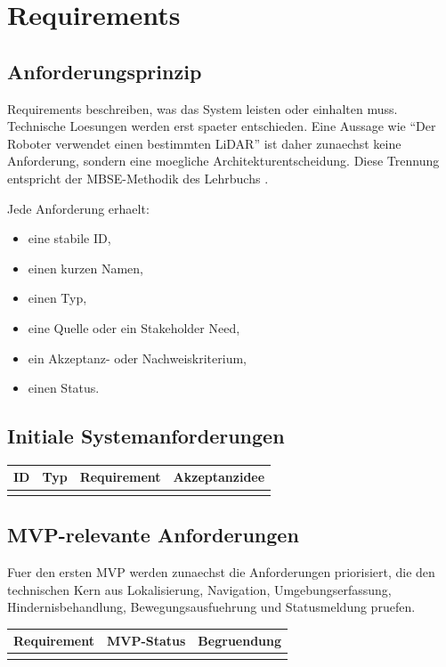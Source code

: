 \chapter{Requirements}

\section{Anforderungsprinzip}

Requirements beschreiben, was das System leisten oder einhalten muss. Technische Loesungen werden erst spaeter entschieden. Eine Aussage wie \enquote{Der Roboter verwendet einen bestimmten LiDAR} ist daher zunaechst keine Anforderung, sondern eine moegliche Architekturentscheidung. Diese Trennung entspricht der MBSE-Methodik des Lehrbuchs \cite[Kap.~6]{becker2026sysml}.

Jede Anforderung erhaelt:
\begin{itemize}
  \item eine stabile ID,
  \item einen kurzen Namen,
  \item einen Typ,
  \item eine Quelle oder ein Stakeholder Need,
  \item ein Akzeptanz- oder Nachweiskriterium,
  \item einen Status.
\end{itemize}

\section{Initiale Systemanforderungen}

\begin{longtable}{L{0.15\textwidth} L{0.16\textwidth} L{0.36\textwidth} L{0.18\textwidth}}
\toprule
ID & Typ & Requirement & Akzeptanzidee \\
\midrule
{}
\bottomrule
\end{longtable}

\section{MVP-relevante Anforderungen}

Fuer den ersten MVP werden zunaechst die Anforderungen priorisiert, die den technischen Kern aus Lokalisierung, Navigation, Umgebungserfassung, Hindernisbehandlung, Bewegungsausfuehrung und Statusmeldung pruefen.

\begin{longtable}{L{0.18\textwidth} L{0.16\textwidth} L{0.48\textwidth}}
\toprule
Requirement & MVP-Status & Begruendung \\
\midrule
{}
\bottomrule
\end{longtable}

